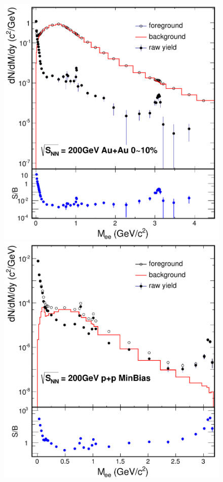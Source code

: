 \begin{lyxcode}
\begin{figure}
\begin{centering}
\begin{minipage}[t][1\totalheight][s]{0.33\columnwidth}
\begin{center}
\includegraphics[width=1\textwidth]{fig/3.Analysis/background/AuAu/SBRatio_AuAu_Cen}
\par\end{center}%
\end{minipage}%
\begin{minipage}[t][1\totalheight][s]{0.33\columnwidth}%
\begin{center}
\includegraphics[width=1\textwidth]{fig/3.Analysis/background/pp/SBRatio_PP_MinBias}

\end{center}
\end{minipage}
\end{centering}
\end{figure}
\end{lyxcode}

